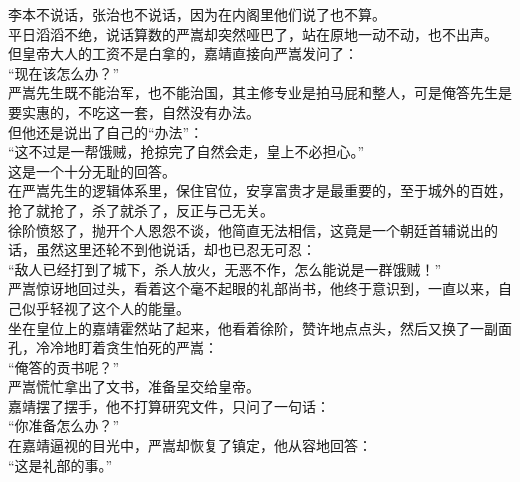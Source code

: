 \begin{multicols}{\theparacolNo}
李本不说话，张治也不说话，因为在内阁里他们说了也不算。\\

平日滔滔不绝，说话算数的严嵩却突然哑巴了，站在原地一动不动，也不出声。\\

但皇帝大人的工资不是白拿的，嘉靖直接向严嵩发问了：\\

“现在该怎么办？”\\

严嵩先生既不能治军，也不能治国，其主修专业是拍马屁和整人，可是俺答先生是要实惠的，不吃这一套，自然没有办法。\\

但他还是说出了自己的“办法”：\\

“这不过是一帮饿贼，抢掠完了自然会走，皇上不必担心。”\\

这是一个十分无耻的回答。\\

在严嵩先生的逻辑体系里，保住官位，安享富贵才是最重要的，至于城外的百姓，抢了就抢了，杀了就杀了，反正与己无关。\\

徐阶愤怒了，抛开个人恩怨不谈，他简直无法相信，这竟是一个朝廷首辅说出的话，虽然这里还轮不到他说话，却也已忍无可忍：\\

“敌人已经打到了城下，杀人放火，无恶不作，怎么能说是一群饿贼！”\\

严嵩惊讶地回过头，看着这个毫不起眼的礼部尚书，他终于意识到，一直以来，自己似乎轻视了这个人的能量。\\

坐在皇位上的嘉靖霍然站了起来，他看着徐阶，赞许地点点头，然后又换了一副面孔，冷冷地盯着贪生怕死的严嵩：\\

“俺答的贡书呢？”\\

严嵩慌忙拿出了文书，准备呈交给皇帝。\\

嘉靖摆了摆手，他不打算研究文件，只问了一句话：\\

“你准备怎么办？”\\

在嘉靖逼视的目光中，严嵩却恢复了镇定，他从容地回答：\\

“这是礼部的事。”\\


\end{multicols}
